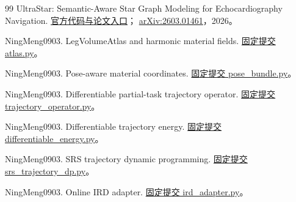 \documentclass[11pt,a4paper,fontset=fandol]{ctexart}
\theoremstyle{definition}
\theoremstyle{remark}\newtheorem{remark}[theorem]{说明}
\numberwithin{equation}{section}
\begin{document}
\begin{thebibliography}{99}
UltraStar: Semantic-Aware Star Graph Modeling for Echocardiography Navigation.
\href{https://github.com/LeapLabTHU/UltraStar}{官方代码与论文入口}；
\href{https://arxiv.org/abs/2603.01461}{arXiv:2603.01461}，2026。

NingMeng0903. LegVolumeAtlas and harmonic material fields.
\href{https://github.com/NingMeng0903/RealUS_playground/blob/190e9e3cec96f2a467884b545e465364cfc76501/src/projects/genesis_ue_sync/anatomy_retarget/leg_volume_coordinates/atlas.py}{固定提交 atlas.py}。

NingMeng0903. Pose-aware material coordinates.
\href{https://github.com/NingMeng0903/RealUS_playground/blob/190e9e3cec96f2a467884b545e465364cfc76501/src/projects/genesis_ue_sync/anatomy_retarget/leg_volume_coordinates/pose_bundle.py}{固定提交 pose\_bundle.py}。

NingMeng0903. Differentiable partial-task trajectory operator.
\href{https://github.com/NingMeng0903/RealUS_playground/blob/190e9e3cec96f2a467884b545e465364cfc76501/ird_playground/ird_playground/region/trajectory_operator.py}{固定提交 trajectory\_operator.py}。

NingMeng0903. Differentiable trajectory energy.
\href{https://github.com/NingMeng0903/RealUS_playground/blob/190e9e3cec96f2a467884b545e465364cfc76501/ird_playground/ird_playground/optimization/differentiable_energy.py}{固定提交 differentiable\_energy.py}。

NingMeng0903. SRS trajectory dynamic programming.
\href{https://github.com/NingMeng0903/RealUS_playground/blob/190e9e3cec96f2a467884b545e465364cfc76501/ird_playground/ird_playground/optimization/srs_trajectory_dp.py}{固定提交 srs\_trajectory\_dp.py}。

NingMeng0903. Online IRD adapter.
\href{https://github.com/NingMeng0903/RealUS_playground/blob/190e9e3cec96f2a467884b545e465364cfc76501/rm75_control/rm75_control/control/joint_admittance_8dof/tasks/ird_adapter.py}{固定提交 ird\_adapter.py}。

\end{thebibliography}
\end{document}
